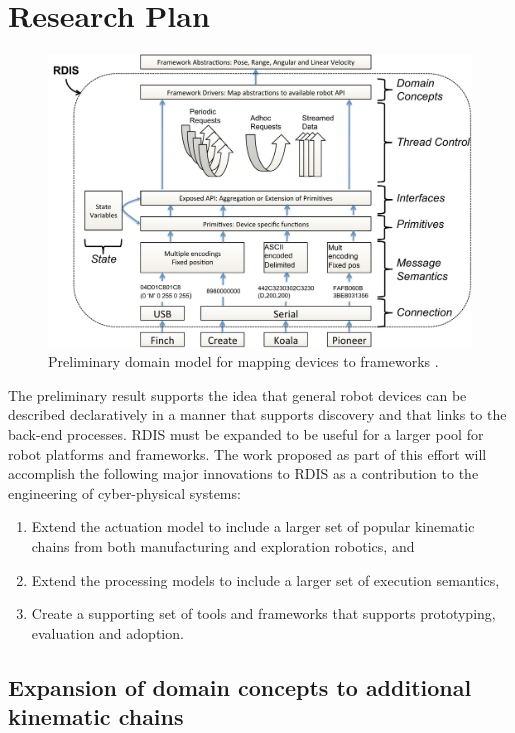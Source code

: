 
\section{Research Plan}
\label{sec:research-plan}

\begin{figure}[thpb]
      \centering
      \includegraphics[width=6in]{dm.pdf}
      \caption{Preliminary domain model for mapping devices to frameworks \cite{Anderson2012}.}
      \label{dm}
\end{figure}

The preliminary result supports the idea that general robot devices can be described declaratively in a manner that supports discovery and that links to the back-end processes.  RDIS must be expanded to be useful for a larger pool for robot platforms and frameworks.  The work proposed as part of this effort will accomplish the following major innovations to RDIS as a contribution to the engineering of cyber-physical systems: 
\begin{enumerate}
\item Extend the actuation model to include a larger set of popular kinematic chains from both manufacturing and exploration robotics, and
\item Extend the processing models to include a larger set of execution semantics, 
\item Create a supporting set of tools and frameworks that supports prototyping, evaluation and adoption.   
\end{enumerate}

\subsection{Expansion of domain concepts to additional kinematic chains}
\label{sec:kin}


